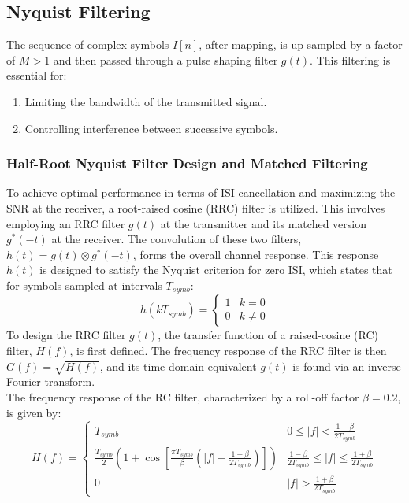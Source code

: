 \subsection{Nyquist Filtering}
The sequence of complex symbols $I[n]$, after mapping, is up-sampled by a factor of $M > 1$ and then passed through a pulse shaping filter $g(t)$. This filtering is essential for:
\begin{enumerate}
	\item Limiting the bandwidth of the transmitted signal.
	\item Controlling interference between successive symbols.
\end{enumerate}

\subsubsection{Half-Root Nyquist Filter Design and Matched Filtering}
To achieve optimal performance in terms of ISI cancellation and maximizing the SNR at the receiver, a root-raised cosine (RRC) filter is utilized. This involves employing an RRC filter $g(t)$ at the transmitter and its matched version $g^*(-t)$ at the receiver. The convolution of these two filters, $h(t) = g(t) \otimes g^*(-t)$, forms the overall channel response. This response $h(t)$ is designed to satisfy the Nyquist criterion for zero ISI, which states that for symbols sampled at intervals $T_{symb}$:
\begin{equation}
	h(kT_{symb}) = \begin{cases}
		1 & k=0 \\
		0 & k \neq 0
	\end{cases}
\end{equation}
To design the RRC filter $g(t)$, the transfer function of a raised-cosine (RC) filter, $H(f)$, is first defined. The frequency response of the RRC filter is then $G(f) = \sqrt{H(f)}$, and its time-domain equivalent $g(t)$ is found via an inverse Fourier transform.\\
The frequency response of the RC filter, characterized by a roll-off factor $\beta = 0.2$, is given by:
\begin{equation}
	H(f) = \begin{cases}
		T_{symb} & 0 \le |f| < \frac{1-\beta}{2T_{symb}} \\ %
		\frac{T_{symb}}{2} \left(1 + \cos\left[\frac{\pi T_{symb}}{\beta}\left(|f| - \frac{1-\beta}{2T_{symb}}\right)\right]\right) & \frac{1-\beta}{2T_{symb}} \le |f| \le \frac{1+\beta}{2T_{symb}} \\ %
		0 & |f| > \frac{1+\beta}{2T_{symb}} %
	\end{cases}
\end{equation}

